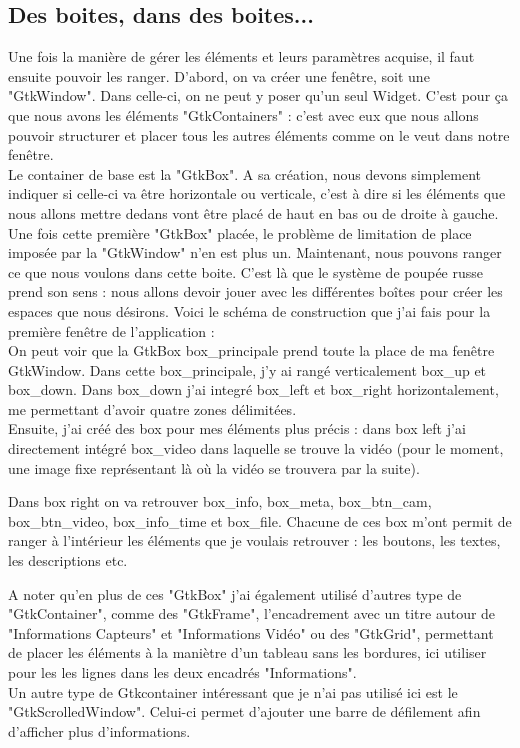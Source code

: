 \documentclass[11pt,french,a4paper]{report}
\begin{document}
        \subsection{Des boites, dans des boites...}
Une fois la manière de gérer les éléments et leurs paramètres acquise, il faut ensuite pouvoir les ranger. 
D'abord, on va créer une fenêtre, soit une "GtkWindow". Dans celle-ci, on ne peut y poser qu'un seul Widget. C'est pour ça que nous
avons les éléments "GtkContainers" : c'est avec eux que nous allons pouvoir structurer et placer tous les autres éléments 
comme on le veut dans notre fenêtre. \\

Le container de base est la "GtkBox". A sa création, nous devons simplement indiquer si celle-ci va être horizontale ou verticale, 
c'est à dire si les éléments que nous allons mettre dedans vont être placé de haut en bas ou de droite à gauche. 
Une fois cette première "GtkBox" placée, le problème de limitation de place imposée par la "GtkWindow" n'en est plus un. 
Maintenant, nous pouvons ranger ce que nous voulons dans cette boite. C'est là que le système de poupée russe prend son sens : 
nous allons devoir jouer avec les différentes boîtes pour créer les espaces que nous désirons. Voici le schéma de construction 
que j'ai fais pour la première fenêtre de l'application : \\


On peut voir que la GtkBox box\_principale prend toute la place de ma fenêtre GtkWindow. Dans cette box\_principale, j'y ai rangé 
verticalement box\_up et box\_down. Dans box\_down j'ai integré box\_left et box\_right horizontalement, me permettant d'avoir 
quatre zones délimitées. \\
Ensuite, j'ai créé des box pour mes éléments plus précis : dans box left j'ai directement intégré box\_video dans laquelle 
se trouve la vidéo (pour le moment, une image fixe représentant là où la vidéo se trouvera par la suite). 

Dans box right on va retrouver box\_info, box\_meta, box\_btn\_cam, box\_btn\_video, box\_info\_time et box\_file. 
Chacune de ces box m'ont permit de ranger à l'intérieur les éléments que je voulais retrouver : 
les boutons, les textes, les descriptions etc. 

A noter qu'en plus de ces "GtkBox" j'ai également utilisé d'autres type de "GtkContainer", comme des "GtkFrame", l'encadrement
avec un titre autour de "Informations Capteurs" et "Informations Vidéo" ou des "GtkGrid", permettant de placer les éléments 
à la maniètre d'un tableau sans les bordures, ici utiliser pour les les lignes dans les deux encadrés "Informations". \\
Un autre type de Gtkcontainer intéressant que je n'ai pas utilisé ici est le "GtkScrolledWindow". Celui-ci permet d'ajouter
une barre de défilement afin d'afficher plus d'informations. \\
\end{document}
